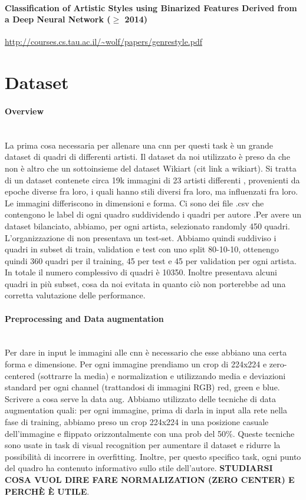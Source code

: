 \documentclass{article}
\begin{document}
\paragraph{Classification of Artistic Styles using Binarized
	Features Derived from a Deep Neural Network ($\geq$ 2014)}\url{http://courses.cs.tau.ac.il/~wolf/papers/genrestyle.pdf}\\


\section{Dataset}

\paragraph{Overview}\mbox{}\\
La prima cosa necessaria per allenare una cnn per questi task è un grande dataset di quadri di differenti artisti. Il dataset da noi utilizzato è preso da \cite{ArtGANDataset} che non è altro che un sottoinsieme del dataset Wikiart (cit link a wikiart). Si tratta di un dataset contenete circa 19k immagini di 23 artisti differenti , provenienti da epoche diverse fra loro, i quali hanno stili diversi fra loro, ma influenzati fra loro. Le immagini differiscono in dimensioni e forma.  Ci sono dei file .csv che contengono le label di ogni quadro suddividendo i quadri per  autore .Per avere un dataset bilanciato, abbiamo, per ogni artista, selezionato randomly 450 quadri.
L'organizzazione di \cite{ArtGANDataset} non presentava un test-set. Abbiamo quindi suddiviso i quadri in subset di train, validation e test con uno split 80-10-10, ottenengo quindi 360 quadri per il training, 45 per test e 45 per validation per ogni artista. In totale il numero complessivo di quadri è 10350.
Inoltre \cite{ArtGANDataset} presentava alcuni quadri in più subset, cosa da noi evitata in quanto ciò non porterebbe ad una corretta valutazione delle performance.
\paragraph{Preprocessing and Data augmentation}\mbox{}\\
Per dare in input le immagini alle cnn è necessario che esse abbiano una certa forma e dimensione. Per ogni immagine prendiamo un crop di 224x224 e zero-centered (sottrarre la media) e normalization e utilizzando media e deviazioni standard per ogni channel (trattandosi di immagini RGB) red, green e blue. \\
Scrivere a cosa serve la data aug. Abbiamo utilizzato delle tecniche di data augmentation quali: per ogni immagine, prima di darla in input alla rete nella fase di training, abbiamo preso un crop 224x224 in una posizione casuale dell'immagine e flippato orizzontalmente con una prob del 50\%. Queste tecniche sono usate in task di visual recognition per aumentare il dataset e ridurre la possibilità di incorrere in overfitting.
Inoltre, per questo specifico task, ogni punto del quadro ha contenuto informativo sullo stile dell'autore.
\textbf{STUDIARSI COSA VUOL DIRE FARE NORMALIZATION (ZERO CENTER) E PERCHÈ È UTILE}.
\end{document}
